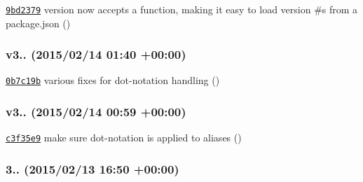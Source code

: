 \begin{DoxyItemize}
\item \href{https://github.com/bcoe/yargs/commit/9bd237921cf1b61fd9f32c0e6d23f572fc225861}{\tt 9bd2379} version now accepts a function, making it easy to load version \#s from a package.\+json ()
\end{DoxyItemize}

\subsubsection*{v3.. (2015/02/14 01\+:40 +00\+:00)}


\begin{DoxyItemize}
\item \href{https://github.com/bcoe/yargs/commit/0b7c19beaecb747267ca4cc10e5cb2a8550bc4b7}{\tt 0b7c19b} various fixes for dot-\/notation handling ()
\end{DoxyItemize}

\subsubsection*{v3.. (2015/02/14 00\+:59 +00\+:00)}


\begin{DoxyItemize}
\item \href{https://github.com/bcoe/yargs/commit/c3f35e99bd5a0d278073fcadd95e2d778616cc17}{\tt c3f35e9} make sure dot-\/notation is applied to aliases ()
\end{DoxyItemize}

\subsubsection*{3.. (2015/02/13 16\+:50 +00\+:00)}


